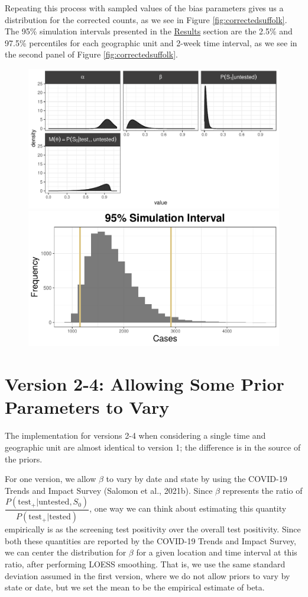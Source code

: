 \documentclass[12pt,twoside]{smiththesis}
\begin{document}
Repeating this process with sampled values of the bias parameters gives us a distribution for the corrected counts, as we see in Figure \ref{fig:correctedsuffolk}. The 95\% simulation intervals presented in the \protect\hyperlink{res}{Results} section are the 2.5\% and 97.5\% percentiles for each geographic unit and 2-week time interval, as we see in the second panel of Figure \ref{fig:correctedsuffolk}.
\begin{figure}
\includegraphics[width=0.5\linewidth]{thesis_files/figure-latex/unnamed-chunk-67-1} \includegraphics[width=0.5\linewidth]{thesis_files/figure-latex/unnamed-chunk-67-2} \caption{\label{fig:correctedsuffolk}}\label{fig:unnamed-chunk-67}
\end{figure}
\hypertarget{version-2-4-allowing-some-prior-parameters-to-vary}{%
\section{Version 2-4: Allowing Some Prior Parameters to Vary}\label{version-2-4-allowing-some-prior-parameters-to-vary}}

The implementation for versions 2-4 when considering a single time and geographic unit are almost identical to version 1; the difference is in the source of the priors.

For one version, we allow \(\beta\) to vary by date and state by using the COVID-19 Trends and Impact Survey (Salomon et al., 2021b). Since \(\beta\) represents the ratio of \(\dfrac{P(\text{test}_+|\text{untested},S_0)}{P(\text{test}_+|\text{tested})}\), one way we can think about estimating this quantity empirically is as the screening test positivity over the overall test positivity. Since both these quantities are reported by the COVID-19 Trends and Impact Survey, we can center the distribution for \(\beta\) for a given location and time interval at this ratio, after performing LOESS smoothing. That is, we use the same standard deviation assumed in the first version, where we do not allow priors to vary by state or date, but we set the mean to be the empirical estimate of beta.
\end{document}
